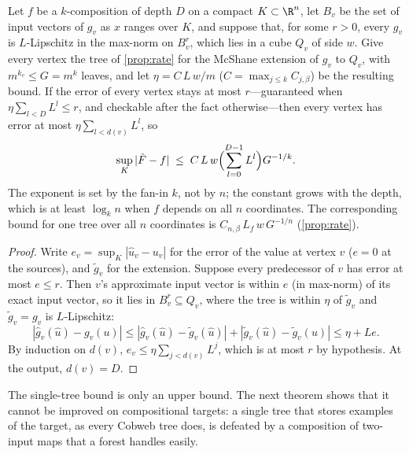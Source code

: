 \begin{theorem}\label{thm:compose}
Let $f$ be a $k$-composition of depth $D$ on a compact $K\subset\R^n$, let $B_v$ be the
set of input vectors of $g_v$ as $x$ ranges over $K$, and suppose that, for some $r>0$,
every $g_v$ is $L$-Lipschitz in the max-norm on $B_v^r$, which lies in a cube $Q_v$ of side
$w$.  Give every vertex the tree of \cref{prop:rate} for the McShane extension of $g_v$ to
$Q_v$, with $m^{k_v}\le G=m^k$ leaves, and let $\eta=C\,L\,w/m$ ($C=\max_{j\le k}C_{j,\beta}$)
be the resulting bound.  If the error of every vertex stays at most $r$---guaranteed when
$\eta\sum_{l<D}L^l\le r$, and checkable after the fact otherwise---then every vertex has
error at most $\eta\sum_{l<d(v)}L^l$, so
\[
  \sup_K|\hat F-f|\;\le\;C\,L\,w\Bigl(\sum_{l=0}^{D-1}L^l\Bigr)G^{-1/k}.
\]
The exponent is set by the fan-in $k$, not by $n$; the constant grows with the depth, which
is at least $\log_kn$ when $f$ depends on all $n$ coordinates.  The corresponding bound for
one tree over all $n$ coordinates is $C_{n,\beta}\,L_f\,w\,G^{-1/n}$ (\cref{prop:rate}).
\end{theorem}

\begin{proof}
Write $e_v=\sup_K|\hat u_v-u_v|$ for the error of the value at vertex $v$ ($e=0$ at the
sources), and $\tilde g_v$ for the extension.  Suppose every predecessor of $v$ has error at
most $e\le r$.  Then $v$'s
approximate input vector is within $e$ (in max-norm) of its exact input vector, so it lies
in $B_v^r\subseteq Q_v$, where the tree is within $\eta$ of $\tilde g_v$ and $\tilde g_v=g_v$
is $L$-Lipschitz:
\[
  |\hat g_v(\hat u)-g_v(u)|\le|\hat g_v(\hat u)-\tilde g_v(\hat u)|+|\tilde g_v(\hat u)-\tilde g_v(u)|\le\eta+Le.
\]
By induction on $d(v)$, $e_v\le\eta\sum_{j<d(v)}L^j$, which is at most $r$ by hypothesis.  At the
output, $d(v)=D$.
\end{proof}

The single-tree bound is only an upper bound.  The next theorem shows that it cannot be
improved on compositional targets: a single tree that stores examples of the target, as every
Cobweb tree does, is defeated by a composition of two-input maps that a forest handles easily.


